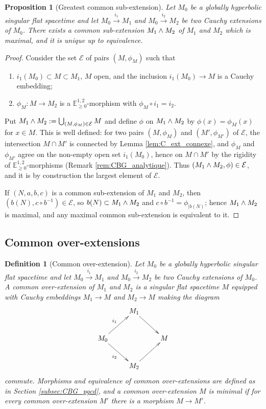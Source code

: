 \documentclass[a4paper,twoside]{article}
\newcommand{\mass}[1]{\mathbb{E}^{1,2}_{#1}}
\newtheorem{prop}[lem]{Proposition}
\newtheorem{defi}[lem]{Definition}
\begin{document}
\begin{prop}[Greatest common sub-extension]\label{prop:Cauchy_pgcd}
Let $M_0$ be a globally hyperbolic singular flat spacetime and let $M_0\xrightarrow{i_1} M_1$ and
$M_0\xrightarrow{i_2} M_2$ be two Cauchy extensions of $M_0$. There exists a common sub-extension
$M_1 \wedge M_2$ of $M_1$ and $M_2$ which is maximal, and it is unique up to equivalence.
\end{prop}
\begin{proof}
Consider the set $\mathcal E$ of pairs $(M,\phi_M)$ such that
\begin{enumerate}[label=(\alph*)]
\item $i_1(M_0)\subset M\subset M_1$, $M$ open, and the inclusion $i_1(M_0)\rightarrow M$ is a Cauchy embedding;
\item $\phi_M:M\rightarrow M_2$ is a $\mass{\geq0}$-morphism with $\phi_M\circ i_1=i_2$.
\end{enumerate}
Put $M_1 \wedge M_2:=\bigcup_{(M,\phi_M)\in \mathcal E} M$ and define $\phi$ on $M_1 \wedge M_2$ by $\phi(x)=\phi_M(x)$
for $x\in M$. This is well defined: for two pairs $(M,\phi_M)$ and $(M',\phi_{M'})$ of $\mathcal E$,
the intersection $M\cap M'$ is connected by Lemma \ref{lem:C_ext_connexe}, and $\phi_M$ and
$\phi_{M'}$ agree on the non-empty open set $i_1(M_0)$, hence on $M\cap M'$ by the rigidity of
$\mass{\geq0}$-morphisms (Remark \ref{rem:CBG_analytique}). Thus $(M_1 \wedge M_2,\phi)\in \mathcal E$, and it
is by construction the largest element of $\mathcal E$.

If $(N,a,b,c)$ is a common sub-extension of $M_1$ and $M_2$, then $\left(b(N),c\circ
b^{-1}\right)\in \mathcal E$, so $b(N)\subset M_1 \wedge M_2$ and $c\circ b^{-1}=\phi_{|b(N)}$; hence $M_1 \wedge M_2$
is maximal, and any maximal common sub-extension is equivalent to it.
\end{proof}

\subsection{Common over-extensions}\label{subsec:CBG_ppcm}

\begin{defi}[Common over-extension]
Let $M_0$ be a globally hyperbolic singular flat spacetime and let $M_0\xrightarrow{i_1} M_1$ and
$M_0\xrightarrow{i_2} M_2$ be two Cauchy extensions of $M_0$. A \emph{common over-extension} of
$M_1$ and $M_2$ is a singular flat spacetime $M$ equipped with Cauchy embeddings $M_1\rightarrow M$
and $M_2\rightarrow M$ making the diagram
$$
	\xymatrix{
		& M_1\ar[dr]&\\
		M_0\ar[ur]^{i_1} \ar[dr]_{i_2}&&M \\
		& M_2\ar[ur]&
	}
$$
commute. Morphisms and equivalence of common over-extensions are defined as in Section
\ref{subsec:CBG_pgcd}, and a common over-extension $M$ is \emph{minimal} if for every common
over-extension $M'$ there is a morphism $M\rightarrow M'$.
\end{defi}
\end{document}

